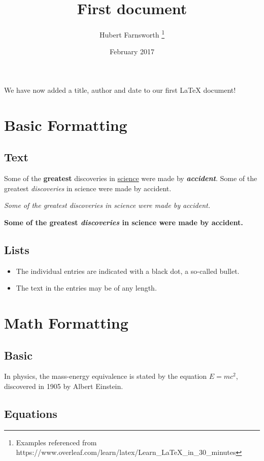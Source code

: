 \documentclass[12pt, letterpaper]{article}
\title{First document}
\author{Hubert Farnsworth \thanks{Examples referenced from https://www.overleaf.com/learn/latex/Learn\_LaTeX\_in\_30\_minutes}}
\date{February 2017}
\begin{document}
\maketitle


We have now added a title, author and date to our first \LaTeX{} document!

\section{Basic Formatting}

\subsection{Text}

Some of the \textbf{greatest}
discoveries in \underline{science} 
were made by \textbf{\textit{accident}}.
Some of the greatest \emph{discoveries} 
in science 
were made by accident.

\textit{Some of the greatest \emph{discoveries} 
in science 
were made by accident.}

\textbf{Some of the greatest \emph{discoveries} 
in science 
were made by accident.}

\subsection{Lists}

\begin{itemize}
  \item The individual entries are indicated with a black dot, a so-called bullet.
  \item The text in the entries may be of any length.
\end{itemize}

\section{Math Formatting}

\subsection{Basic}

In physics, the mass-energy equivalence is stated 
by the equation $E=mc^2$, discovered in 1905 by Albert Einstein.

\subsection{Equations}
\end{document}
